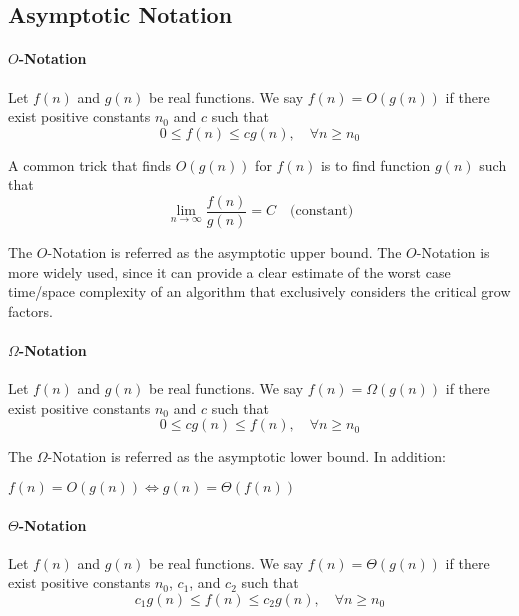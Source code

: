         \subsection{Asymptotic Notation}
            \paragraph{$O$-Notation}
                Let $f(n)$ and $g(n)$ be real functions. We say $f(n) = O(g(n))$ if there exist positive constants $n_0$ and $c$ such that
                \begin{equation*}
                    0 \le f(n) \le cg(n), \quad \forall n \ge n_0
                \end{equation*}

                A common trick that finds $O(g(n))$ for $f(n)$ is to find function $g(n)$ such that 
                \begin{equation*}
                    \lim_{n \rightarrow \infty} \frac{f(n)}{g(n)} = C \quad \text{(constant)}
                \end{equation*}

                The $O$-Notation is referred as the asymptotic upper bound. The $O$-Notation is more widely used, since it can provide a clear estimate of the worst case time/space complexity of an algorithm that exclusively considers the critical grow factors.

            \paragraph{$\Omega$-Notation}
                Let $f(n)$ and $g(n)$ be real functions. We say $f(n) = \Omega(g(n))$ if there exist positive constants $n_0$ and $c$ such that
                \begin{equation*}
                    0 \le cg(n) \le f(n), \quad \forall n \ge n_0
                \end{equation*}

                The $\Omega$-Notation is referred as the asymptotic lower bound. In addition:

                \begin{theorem}
                    $f(n) = O(g(n)) \Leftrightarrow g(n) = \Theta(f(n))$
                \end{theorem}
            
            \paragraph{$\Theta$-Notation}
                Let $f(n)$ and $g(n)$ be real functions. We say $f(n) = \Theta(g(n))$ if there exist positive constants $n_0$, $c_1$, and $c_2$ such that
                \begin{equation*}
                    c_1g(n) \le f(n) \le c_2g(n), \quad \forall n \ge n_0
                \end{equation*}

